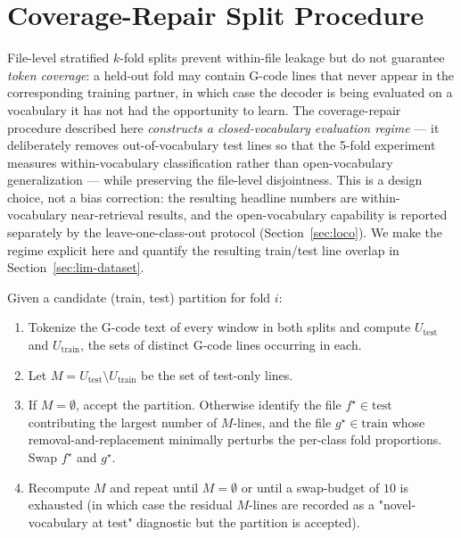 \documentclass[sensors,article,submit,moreauthors,pdftex]{Definitions/mdpi}
\begin{document}
\appendix
\section{Coverage-Repair Split Procedure}
\label{app:coverage-repair}

File-level stratified $k$-fold splits prevent within-file leakage but do not guarantee \emph{token coverage}: a held-out fold may contain G-code lines that never appear in the corresponding training partner, in which case the decoder is being evaluated on a vocabulary it has not had the opportunity to learn. The coverage-repair procedure described here \emph{constructs a closed-vocabulary evaluation regime} --- it deliberately removes out-of-vocabulary test lines so that the 5-fold experiment measures within-vocabulary classification rather than open-vocabulary generalization --- while preserving the file-level disjointness. This is a design choice, not a bias correction: the resulting headline numbers are within-vocabulary near-retrieval results, and the open-vocabulary capability is reported separately by the leave-one-class-out protocol (Section~\ref{sec:loco}). We make the regime explicit here and quantify the resulting train/test line overlap in Section~\ref{sec:lim-dataset}.

Given a candidate (train, test) partition for fold $i$:
\begin{enumerate}[label=(\arabic*), leftmargin=*]
\item Tokenize the G-code text of every window in both splits and compute $U_{\text{test}}$ and $U_{\text{train}}$, the sets of distinct G-code lines occurring in each.
\item Let $M = U_{\text{test}} \setminus U_{\text{train}}$ be the set of test-only lines.
\item If $M = \emptyset$, accept the partition. Otherwise identify the file $f^\star \in \text{test}$ contributing the largest number of $M$-lines, and the file $g^\star \in \text{train}$ whose removal-and-replacement minimally perturbs the per-class fold proportions. Swap $f^\star$ and $g^\star$.
\item Recompute $M$ and repeat until $M = \emptyset$ or until a swap-budget of $10$ is exhausted (in which case the residual $M$-lines are recorded as a "novel-vocabulary at test" diagnostic but the partition is accepted).
\end{enumerate}
\end{document}

